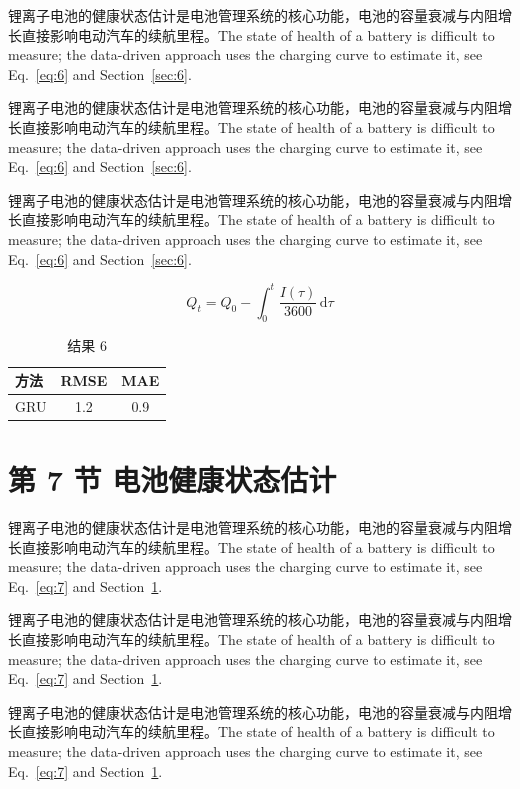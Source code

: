 \documentclass[UTF8,fontset=mac]{ctexart}
\begin{document}
锂离子电池的健康状态估计是电池管理系统的核心功能，电池的容量衰减与内阻增长直接影响电动汽车的续航里程\cite{a2020}。The state of health of a battery is difficult to measure; the data-driven approach uses the charging curve to estimate it, see Eq.~\eqref{eq:6} and Section~\ref{sec:6}.

锂离子电池的健康状态估计是电池管理系统的核心功能，电池的容量衰减与内阻增长直接影响电动汽车的续航里程\cite{a2020}。The state of health of a battery is difficult to measure; the data-driven approach uses the charging curve to estimate it, see Eq.~\eqref{eq:6} and Section~\ref{sec:6}.

锂离子电池的健康状态估计是电池管理系统的核心功能，电池的容量衰减与内阻增长直接影响电动汽车的续航里程\cite{a2020}。The state of health of a battery is difficult to measure; the data-driven approach uses the charging curve to estimate it, see Eq.~\eqref{eq:6} and Section~\ref{sec:6}.

\begin{equation}\label{eq:6}
  Q_t = Q_0 - \int_0^t \frac{I(\tau)}{3600}\,\mathrm{d}\tau
\end{equation}
\begin{table}[h]\centering\begin{tabular}{lcc}\toprule 方法 & RMSE & MAE\\\midrule GRU & 1.2 & 0.9\\\bottomrule\end{tabular}\caption{结果 6}\end{table}

\section{第 7 节 电池健康状态估计}\label{sec:7}
锂离子电池的健康状态估计是电池管理系统的核心功能，电池的容量衰减与内阻增长直接影响电动汽车的续航里程\cite{a2020}。The state of health of a battery is difficult to measure; the data-driven approach uses the charging curve to estimate it, see Eq.~\eqref{eq:7} and Section~\ref{sec:7}.

锂离子电池的健康状态估计是电池管理系统的核心功能，电池的容量衰减与内阻增长直接影响电动汽车的续航里程\cite{a2020}。The state of health of a battery is difficult to measure; the data-driven approach uses the charging curve to estimate it, see Eq.~\eqref{eq:7} and Section~\ref{sec:7}.

锂离子电池的健康状态估计是电池管理系统的核心功能，电池的容量衰减与内阻增长直接影响电动汽车的续航里程\cite{a2020}。The state of health of a battery is difficult to measure; the data-driven approach uses the charging curve to estimate it, see Eq.~\eqref{eq:7} and Section~\ref{sec:7}.
\end{document}
